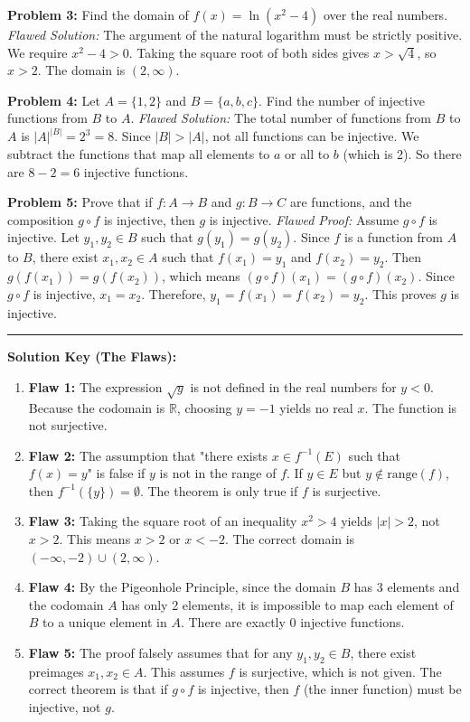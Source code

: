 \documentclass[11pt, a4paper]{article}
\theoremstyle{definition}
\theoremstyle{remark}
\newcommand{\R}{\mathbb{R}}
\begin{document}
\textbf{Problem 3:} Find the domain of $f(x) = \ln(x^2 - 4)$ over the real numbers.
\textit{Flawed Solution:} The argument of the natural logarithm must be strictly positive. We require $x^2 - 4 > 0$. Taking the square root of both sides gives $x > \sqrt{4}$, so $x > 2$. The domain is $(2, \infty)$.

\textbf{Problem 4:} Let $A = \{1, 2\}$ and $B = \{a, b, c\}$. Find the number of injective functions from $B$ to $A$.
\textit{Flawed Solution:} The total number of functions from $B$ to $A$ is $|A|^{|B|} = 2^3 = 8$. Since $|B| > |A|$, not all functions can be injective. We subtract the functions that map all elements to $a$ or all to $b$ (which is 2). So there are $8 - 2 = 6$ injective functions.

\textbf{Problem 5:} Prove that if $f: A \to B$ and $g: B \to C$ are functions, and the composition $g \circ f$ is injective, then $g$ is injective.
\textit{Flawed Proof:} Assume $g \circ f$ is injective. Let $y_1, y_2 \in B$ such that $g(y_1) = g(y_2)$. Since $f$ is a function from $A$ to $B$, there exist $x_1, x_2 \in A$ such that $f(x_1) = y_1$ and $f(x_2) = y_2$. Then $g(f(x_1)) = g(f(x_2))$, which means $(g \circ f)(x_1) = (g \circ f)(x_2)$. Since $g \circ f$ is injective, $x_1 = x_2$. Therefore, $y_1 = f(x_1) = f(x_2) = y_2$. This proves $g$ is injective.

\vspace{1em}
\hrule
\vspace{1em}
\textbf{Solution Key (The Flaws):}
\begin{enumerate}
    \item \textbf{Flaw 1:} The expression $\sqrt{y}$ is not defined in the real numbers for $y < 0$. Because the codomain is $\R$, choosing $y = -1$ yields no real $x$. The function is not surjective.
    \item \textbf{Flaw 2:} The assumption that "there exists $x \in f^{-1}(E)$ such that $f(x) = y$" is false if $y$ is not in the range of $f$. If $y \in E$ but $y \notin \text{range}(f)$, then $f^{-1}(\{y\}) = \emptyset$. The theorem is only true if $f$ is surjective.
    \item \textbf{Flaw 3:} Taking the square root of an inequality $x^2 > 4$ yields $|x| > 2$, not $x > 2$. This means $x > 2$ or $x < -2$. The correct domain is $(-\infty, -2) \cup (2, \infty)$.
    \item \textbf{Flaw 4:} By the Pigeonhole Principle, since the domain $B$ has 3 elements and the codomain $A$ has only 2 elements, it is impossible to map each element of $B$ to a unique element in $A$. There are exactly $0$ injective functions.
    \item \textbf{Flaw 5:} The proof falsely assumes that for any $y_1, y_2 \in B$, there exist preimages $x_1, x_2 \in A$. This assumes $f$ is surjective, which is not given. The correct theorem is that if $g \circ f$ is injective, then $f$ (the inner function) must be injective, not $g$.
\end{enumerate}
\end{document}
